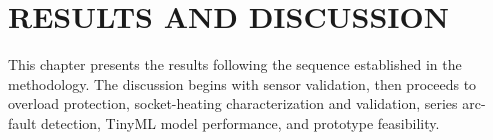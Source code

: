\chapter{RESULTS AND DISCUSSION}
\label{chap:results}

This chapter presents the results following the sequence established in the
methodology. The discussion begins with sensor validation, then proceeds to
overload protection, socket-heating characterization and validation, series
arc-fault detection, TinyML model performance, and prototype feasibility.








